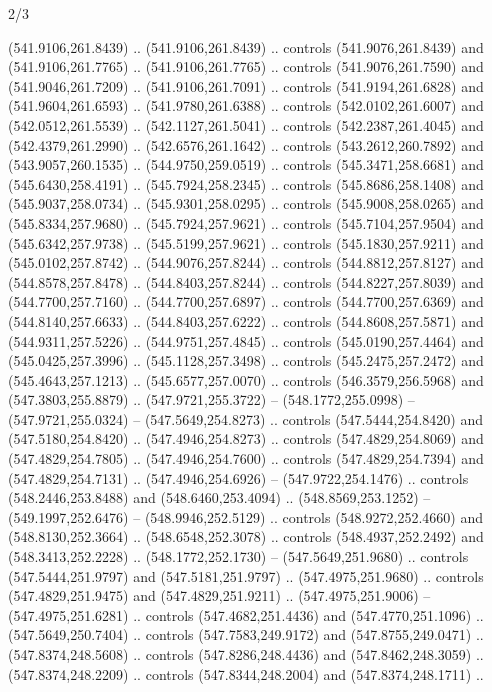 \begin{flagdescription}{2/3}
\begin{scope}[xshift=0.5\flaglength,yshift=0.5\flagwidth,scale=\flagwidth/495.65]
\begin{scope}[y=0.8pt, x=0.8pt, yscale=-1,shift={(-463.76,-309.78)}]
  (541.9106,261.8439) .. (541.9106,261.8439) .. controls (541.9076,261.8439) and
  (541.9106,261.7765) .. (541.9106,261.7765) .. controls (541.9076,261.7590) and
  (541.9046,261.7209) .. (541.9106,261.7091) .. controls (541.9194,261.6828) and
  (541.9604,261.6593) .. (541.9780,261.6388) .. controls (542.0102,261.6007) and
  (542.0512,261.5539) .. (542.1127,261.5041) .. controls (542.2387,261.4045) and
  (542.4379,261.2990) .. (542.6576,261.1642) .. controls (543.2612,260.7892) and
  (543.9057,260.1535) .. (544.9750,259.0519) .. controls (545.3471,258.6681) and
  (545.6430,258.4191) .. (545.7924,258.2345) .. controls (545.8686,258.1408) and
  (545.9037,258.0734) .. (545.9301,258.0295) .. controls (545.9008,258.0265) and
  (545.8334,257.9680) .. (545.7924,257.9621) .. controls (545.7104,257.9504) and
  (545.6342,257.9738) .. (545.5199,257.9621) .. controls (545.1830,257.9211) and
  (545.0102,257.8742) .. (544.9076,257.8244) .. controls (544.8812,257.8127) and
  (544.8578,257.8478) .. (544.8403,257.8244) .. controls (544.8227,257.8039) and
  (544.7700,257.7160) .. (544.7700,257.6897) .. controls (544.7700,257.6369) and
  (544.8140,257.6633) .. (544.8403,257.6222) .. controls (544.8608,257.5871) and
  (544.9311,257.5226) .. (544.9751,257.4845) .. controls (545.0190,257.4464) and
  (545.0425,257.3996) .. (545.1128,257.3498) .. controls (545.2475,257.2472) and
  (545.4643,257.1213) .. (545.6577,257.0070) .. controls (546.3579,256.5968) and
  (547.3803,255.8879) .. (547.9721,255.3722) -- (548.1772,255.0998) --
  (547.9721,255.0324) -- (547.5649,254.8273) .. controls (547.5444,254.8420) and
  (547.5180,254.8420) .. (547.4946,254.8273) .. controls (547.4829,254.8069) and
  (547.4829,254.7805) .. (547.4946,254.7600) .. controls (547.4829,254.7394) and
  (547.4829,254.7131) .. (547.4946,254.6926) -- (547.9722,254.1476) .. controls
  (548.2446,253.8488) and (548.6460,253.4094) .. (548.8569,253.1252) --
  (549.1997,252.6476) -- (548.9946,252.5129) .. controls (548.9272,252.4660) and
  (548.8130,252.3664) .. (548.6548,252.3078) .. controls (548.4937,252.2492) and
  (548.3413,252.2228) .. (548.1772,252.1730) -- (547.5649,251.9680) .. controls
  (547.5444,251.9797) and (547.5181,251.9797) .. (547.4975,251.9680) .. controls
  (547.4829,251.9475) and (547.4829,251.9211) .. (547.4975,251.9006) --
  (547.4975,251.6281) .. controls (547.4682,251.4436) and (547.4770,251.1096) ..
  (547.5649,250.7404) .. controls (547.7583,249.9172) and (547.8755,249.0471) ..
  (547.8374,248.5608) .. controls (547.8286,248.4436) and (547.8462,248.3059) ..
  (547.8374,248.2209) .. controls (547.8344,248.2004) and (547.8374,248.1711) ..

\end{scope}
\end{scope}
\end{flagdescription}
